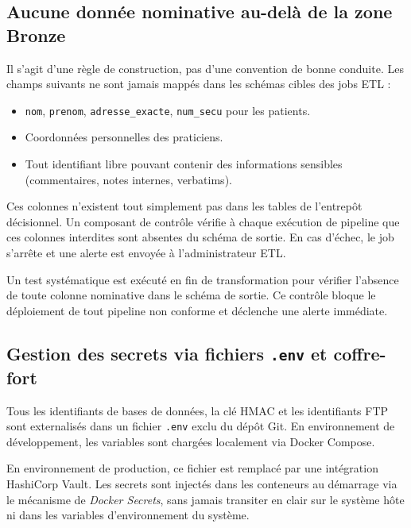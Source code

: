\documentclass[12pt, a4paper]{report}
\begin{document}
\begin{itemize}[label=\textcolor{chuBlue}{\textbullet}]
\subsection{Aucune donnée nominative au-delà de la zone Bronze}

Il s'agit d'une règle de construction, pas d'une convention de bonne conduite. Les champs suivants ne sont jamais mappés dans les schémas cibles des jobs ETL :

\begin{itemize}[label=\textcolor{chuBlue}{\textbullet}]
  \item \texttt{nom}, \texttt{prenom}, \texttt{adresse\_exacte}, \texttt{num\_secu} pour les patients.
  \item Coordonnées personnelles des praticiens.
  \item Tout identifiant libre pouvant contenir des informations sensibles (commentaires, notes internes, verbatims).
\end{itemize}

Ces colonnes n'existent tout simplement pas dans les tables de l'entrepôt décisionnel. Un composant de contrôle vérifie à chaque exécution de pipeline que ces colonnes interdites sont absentes du schéma de sortie. En cas d'échec, le job s'arrête et une alerte est envoyée à l'administrateur ETL.

\begin{warningbox}
Un test systématique est exécuté en fin de transformation pour vérifier l'absence de toute colonne nominative dans le schéma de sortie. Ce contrôle bloque le déploiement de tout pipeline non conforme et déclenche une alerte immédiate.
\end{warningbox}

\subsection{Gestion des secrets via fichiers \texttt{.env} et coffre-fort}
\label{subsec:gestion-secrets}

Tous les identifiants de bases de données, la clé HMAC et les identifiants FTP sont externalisés dans un fichier \texttt{.env} exclu du dépôt Git. En environnement de développement, les variables sont chargées localement via Docker Compose.

En environnement de production, ce fichier est remplacé par une intégration HashiCorp Vault. Les secrets sont injectés dans les conteneurs au démarrage via le mécanisme de \emph{Docker Secrets}, sans jamais transiter en clair sur le système hôte ni dans les variables d'environnement du système.


\end{itemize}
\end{document}
